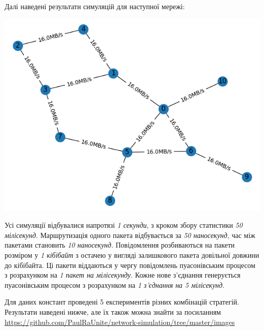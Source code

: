 \documentclass[11pt,a4paper]{article}
\begin{document}
Далі наведені результати симуляцій для наступної мережі:

\includegraphics[width=\textwidth]{graph}

Усі симуляції відбувалися напротязі \emph{1 секунди}, з кроком збору статистики \emph{50 мілісекунд}. Маршрутизація одного пакета відбувається за \emph{50 наносекунд}, час між пакетами становить \emph{10 наносекунд}. Повідомлення розбиваються на пакети розміром у \emph{1 кібібайт} з остачею у вигляді залишкового пакета довільної довжини до кібібайта. Ці пакети віддаються у чергу повідомлень пуасонівським процесом з розрахунком на \emph{1 пакет на мілісекунду}. Кожне нове з'єднання генерується пуасонівським процесом з розрахунком на \emph{1 з'єднання на 5 мілісекунд}.

Для даних констант проведені 5 експериментів різних комбінацій стратегій.
Результати наведені нижче, але їх також можна знайти за посиланням \url{https://github.com/PaulRaUnite/network-simulation/tree/master/images}
\end{document}
